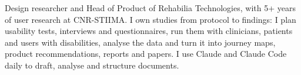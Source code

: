 {Design researcher and Head of Product of Rehabilia Technologies, with 5+ years of user research at CNR-STIIMA. I own studies from protocol to findings: I plan usability tests, interviews and questionnaires, run them with clinicians, patients and users with disabilities, analyse the data and turn it into journey maps, product recommendations, reports and papers. I use Claude and Claude Code daily to draft, analyse and structure documents.}
